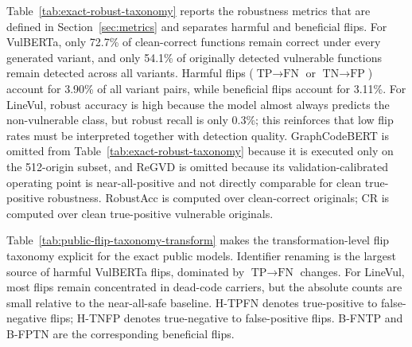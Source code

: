 \documentclass[a4paper,fleqn]{cas-dc}
\begin{document}
Table~\ref{tab:exact-robust-taxonomy} reports the robustness metrics that are
defined in Section~\ref{sec:metrics} and separates harmful and beneficial
flips. For VulBERTa, only 72.7\% of clean-correct functions remain correct
under every generated variant, and only 54.1\% of originally detected
vulnerable functions remain detected across all variants. Harmful flips
($\text{TP}\rightarrow\text{FN}$ or $\text{TN}\rightarrow\text{FP}$) account for
3.90\% of all variant pairs, while beneficial flips account for 3.11\%. For
LineVul, robust accuracy is high because the model almost always predicts the
non-vulnerable class, but robust recall is only 0.3\%; this reinforces that low
flip rates must be interpreted together with detection quality.
GraphCodeBERT is omitted from Table~\ref{tab:exact-robust-taxonomy} because it
is executed only on the 512-origin subset, and ReGVD is omitted because its
validation-calibrated operating point is near-all-positive and not directly
comparable for clean true-positive robustness. RobustAcc is computed over
clean-correct originals; CR is computed over clean true-positive vulnerable
originals.

\begin{table}[t]
  \centering
  \caption{Exact-public robustness and flip taxonomy.}
  \label{tab:exact-robust-taxonomy}
\end{table}

Table~\ref{tab:public-flip-taxonomy-transform} makes the transformation-level
flip taxonomy explicit for the exact public models. Identifier renaming is the
largest source of harmful VulBERTa flips, dominated by
$\text{TP}\rightarrow\text{FN}$ changes. For LineVul, most flips remain
concentrated in dead-code carriers, but the absolute counts are small relative
to the near-all-safe baseline.
H-TPFN denotes true-positive to false-negative flips; H-TNFP denotes
true-negative to false-positive flips. B-FNTP and B-FPTN are the corresponding
beneficial flips.
\end{document}
